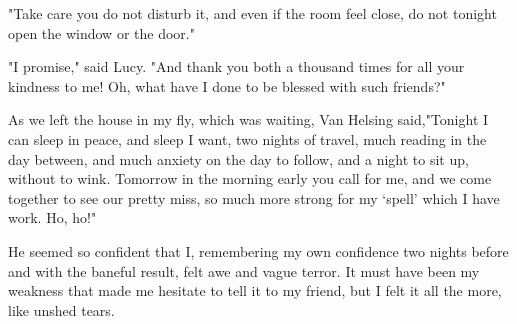 "Take care you do not disturb it, and even if the room feel close, do not tonight open the window or the door." 

"I promise," said Lucy. "And thank you both a thousand times for all your kindness to me! Oh, what have I done to be blessed with such friends?" 

As we left the house in my fly, which was waiting, Van Helsing said,"Tonight I can sleep in peace, and sleep I want, two nights of travel, much reading in the day between, and much anxiety on the day to follow, and a night to sit up, without to wink. Tomorrow in the morning early you call for me, and we come together to see our pretty miss, so much more strong for my `spell' which I have work. Ho, ho!" 

He seemed so confident that I, remembering my own confidence two nights before and with the baneful result, felt awe and vague terror. It must have been my weakness that made me hesitate to tell it to my friend, but I felt it all the more, like unshed tears. 
